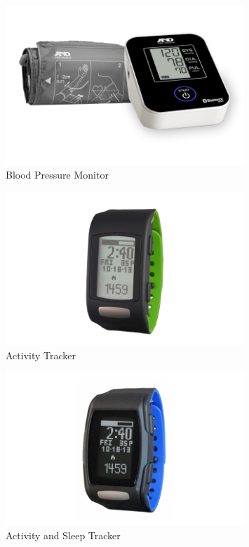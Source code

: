 \documentclass[12pt,]{article}
\numberwithin{figure}{section}
\begin{document}
\begin{figure}
	\begin{center}
		\includegraphics[width=0.8\textwidth]{6}
	\end{center}
    \caption{Blood Pressure Monitor \cite{AND}}
	\label{fig:30}
\end{figure}
\begin{figure}
	\begin{center}
		\includegraphics[width=0.8\textwidth]{7}
	\end{center}
    \caption{Activity Tracker \cite{AND}}
	\label{fig:31}
\end{figure}
\begin{figure}
	\begin{center}
		\includegraphics[width=0.8\textwidth]{8}
	\end{center}
    \caption{Activity and Sleep Tracker \cite{AND}}
	\label{fig:32}
\end{figure}
\end{document}
